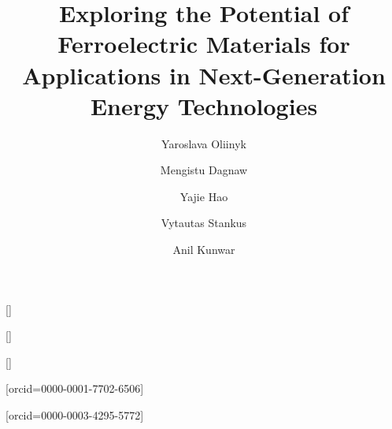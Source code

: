 \documentclass[a4paper,fleqn]{cas-sc}
\begin{document}
\let\WriteBookmarks\relax
\def\floatpagepagefraction{1}
\def\textpagefraction{.001}


\shortauthors{}



\title [mode = title]{Exploring the Potential of Ferroelectric Materials for Applications in Next-Generation Energy Technologies}
\author[a]{Yaroslava Oliinyk}[]
\author[b]{Mengistu Dagnaw}[]
\author[c]{Yajie Hao}[]
\author[d]{Vytautas Stankus}[orcid=0000-0001-7702-6506]
\author[a]{Anil Kunwar}[orcid=0000-0003-4295-5772]
\cormark[1]
\address[a]{Scientific and Didactic Laboratory of Nanotechnology and Material Technologies, Faculty of Mechanical Engineering, Silesian University of Technology,44-100 Gliwice, Poland }
\address[b]{Department of Engineering Materials and Biomaterials, Faculty of Mechanical Engineering, Silesian University of Technology,44-100 Gliwice, Poland}
\address[c]{ Department of Computer Science, Edge Hill University, Ormskirk, L39 4QP, UK}
\address[d] {Department of Physics, Kaunas University of Technology, Studentu Str. 50, LT-51368 Kaunas, Lithuania }
\end{document}
